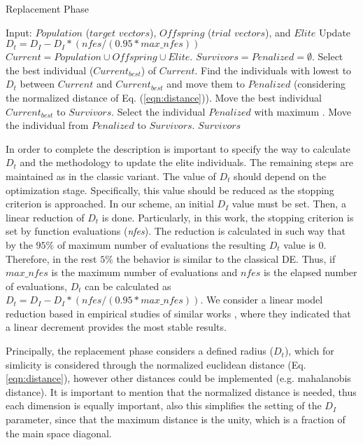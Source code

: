 \begin{algorithm}[H]
  \scriptsize
	\caption{Replacement Phase} \label{alg:Replacement}
	\begin{algorithmic}[1]
	\STATE Input: $Population$ ($target$ $vectors$), $Offspring$ ($trial$ $vectors$), and $Elite$
	\STATE Update $D_t = D_I - D_I *(nfes/(0.95*max\_nfes)) $ 
	\STATE $Current = Population \cup Offspring \cup Elite$.
	\STATE $Survivors = Penalized = \emptyset$.
	   \STATE Select the best individual ($Current_{best}$) of $Current$.
	   \STATE Find the individuals with lowest \DCN{} to $D_t$ between $Current$ and $Current_{best}$ and move them to $Penalized$ (considering the normalized distance of Eq. (\ref{eqn:distance})).
	   \STATE Move the best individual $Current_{best}$ to $Survivors$.
	\ENDWHILE
	   \STATE Select the individual $Penalized$ with maximum \DCN{}.
	   \STATE Move the individual from $Penalized$ to $Survivors$.
	\ENDWHILE
       \RETURN $Survivors$
\end{algorithmic}
\end{algorithm}


In order to complete the description is important to specify the way to calculate $D_t$ and the methodology to update the 
elite individuals.
%
The remaining steps are maintained as in the classic \DE{} variant.
%
The value of $D_t$ should depend on the optimization stage.
%
Specifically, this value should be reduced as the stopping criterion is approached.
%
In our scheme, an initial $D_I$ value must be set.
%
Then, a linear reduction of $D_t$ is done.
%
Particularly, in this work, the stopping criterion is set by function evaluations (\textit{nfes}).
%
The reduction is calculated in such way that by the $95\%$ of maximum number of evaluations the resulting $D_t$ value is $0$.
%
Therefore, in the rest $5\%$ the behavior is similar to the classical DE.
%
Thus, if $max\_nfes$ is the maximum number of evaluations and $nfes$ is the elapsed number of evaluations, $D_t$ can be calculated as $D_t=D_I - D_I *(nfes/(0.95*max\_nfes))$.
%
We consider a linear model reduction based in empirical studies of similar works \cite{segura2016novel}, where they indicated that a linear decrement provides the most stable results.
%

Principally, the replacement phase considers a defined radius ($D_t$), which for simlicity is considered through the normalized euclidean distance (Eq. \ref{eqn:distance}), however other distances could be implemented (e.g. mahalanobis distance).
%
It is important to mention that the normalized distance is needed, thus each dimension is equally important, also this simplifies the setting of the $D_I$ parameter, since that the maximum distance is the unity, which is a fraction of the main space diagonal.


